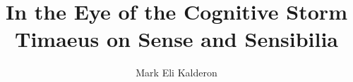 \documentclass[12pt]{book}
\newcommand\myauthor{Mark Eli Kalderon}
\begin{document}
\author{\myauthor}
\title{In the Eye of the Cognitive Storm\\
Timaeus on Sense and Sensibilia}
\date{}

\maketitle
{}
\frontmatter

\tableofcontents



\mainmatter







% 





\backmatter


\nocite{Tobin:1984qf}
\nocite{Marge:1972hl}
\nocite{Wittgenstein:1958cs}
\nocite{Diels:1889it}
\nocite{Waterfield:2003gs}
\nocite{Towey:2000qn}
\nocite{White:2005ln}
\nocite{Hunink:1997kv}
\nocite{Coxon:2009fk}
\nocite{Baltzly:2007gl}
\nocite{Brandwood:1976dz}

 


\end{document}
